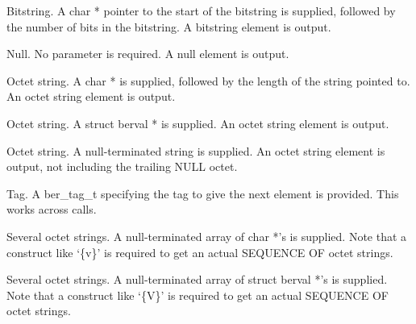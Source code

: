 \documentclass[]{article}
\let\realtextbf=\textbf
\renewcommand{\textbf}[1]{\textcolor{boldcolor}{\realtextbf{#1}}}
\begin{document}
\begin{description}
\itemsep1pt\parskip0pt
\item[\textbf{B}]
Bitstring. A char * pointer to the start of the bitstring is supplied,
followed by the number of bits in the bitstring. A bitstring element is
output.
\end{description}

\begin{description}
\itemsep1pt\parskip0pt
\item[\textbf{n}]
Null. No parameter is required. A null element is output.
\end{description}

\begin{description}
\itemsep1pt\parskip0pt
\item[\textbf{o}]
Octet string. A char * is supplied, followed by the length of the string
pointed to. An octet string element is output.
\end{description}

\begin{description}
\itemsep1pt\parskip0pt
\item[\textbf{O}]
Octet string. A struct berval * is supplied. An octet string element is
output.
\end{description}

\begin{description}
\itemsep1pt\parskip0pt
\item[\textbf{s}]
Octet string. A null-terminated string is supplied. An octet string
element is output, not including the trailing NULL octet.
\end{description}

\begin{description}
\itemsep1pt\parskip0pt
\item[\textbf{t}]
Tag. A ber\_tag\_t specifying the tag to give the next element is
provided. This works across calls.
\end{description}

\begin{description}
\itemsep1pt\parskip0pt
\item[\textbf{v}]
Several octet strings. A null-terminated array of char *'s is supplied.
Note that a construct like `\{v\}' is required to get an actual SEQUENCE
OF octet strings.
\end{description}

\begin{description}
\itemsep1pt\parskip0pt
\item[\textbf{V}]
Several octet strings. A null-terminated array of struct berval *'s is
supplied. Note that a construct like `\{V\}' is required to get an
actual SEQUENCE OF octet strings.
\end{description}
\end{document}
